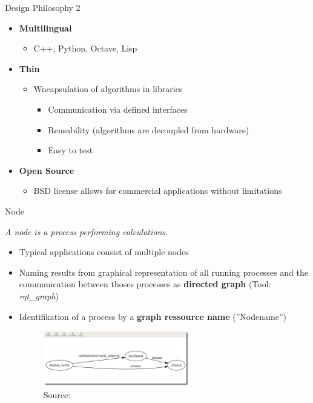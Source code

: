\documentclass{beamer}
\begin{document}
\begin{frame}{Design Philosophy 2}
 \begin{itemize}
  \item \textbf{Multilingual}
  \begin{itemize}
   \item C++, Python, Octave, Lisp
  \end{itemize}
 \end{itemize}
 \begin{itemize}
  \item \textbf{Thin}
  \begin{itemize}
   \item Wncapsulation of algorithms in libraries
   \begin{itemize}
    \item Communication via defined interfaces
    \item Reusability (algorithms are decoupled from hardware)
    \item Easy to test
   \end{itemize}
  \end{itemize}
 \end{itemize}
 \begin{itemize}
  \item \textbf{Open Source}
  \begin{itemize}
   \item BSD license allows for commercial applications without limitations
  \end{itemize}
 \end{itemize}
\end{frame}
\begin{frame}{Node}
\begin{definition}[Node]
\textit{A node is a process performing calculations.}
\end{definition}
 \begin{itemize}
  \item Typical applications consist of multiple nodes
  \item Naming results from graphical representation of all running processes and the communication between thoses processes as \textbf{directed graph} (Tool: \textit{rqt\_graph})
  \item Identifikation of a process by a \textbf{graph ressource name} (''Nodename'')
  \begin{figure}[H]
   \centering
   \includegraphics[width=0.6\textwidth]{rxgraph-turtle-key.png}
   \caption{Source: \cite{ROS:2015:Online}}
   \label{fig:ros_graph}
  \end{figure}
 \end{itemize}
\end{frame}
\end{document}
